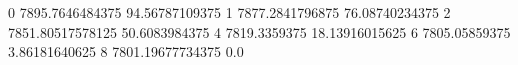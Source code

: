 0 7895.7646484375 94.56787109375
1 7877.2841796875 76.08740234375
2 7851.80517578125 50.6083984375
4 7819.3359375 18.13916015625
6 7805.05859375 3.86181640625
8 7801.19677734375 0.0
